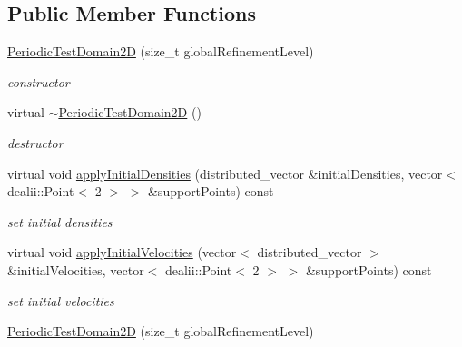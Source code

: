 \subsection*{Public Member Functions}
\begin{DoxyCompactItemize}
\item 
\hyperlink{classnatrium_1_1PeriodicTestDomain2D_a930da37a3e1be744aaf59e27ba956318}{Periodic\-Test\-Domain2\-D} (size\-\_\-t global\-Refinement\-Level)
\begin{DoxyCompactList}\small\item\em constructor \end{DoxyCompactList}\item 
\hypertarget{classnatrium_1_1PeriodicTestDomain2D_a81fe3504b294cd4d6219c360f465f84b}{virtual \hyperlink{classnatrium_1_1PeriodicTestDomain2D_a81fe3504b294cd4d6219c360f465f84b}{$\sim$\-Periodic\-Test\-Domain2\-D} ()}\label{classnatrium_1_1PeriodicTestDomain2D_a81fe3504b294cd4d6219c360f465f84b}

\begin{DoxyCompactList}\small\item\em destructor \end{DoxyCompactList}\item 
virtual void \hyperlink{classnatrium_1_1PeriodicTestDomain2D_abd87cfcf8cd6178c435bec6365923069}{apply\-Initial\-Densities} (distributed\-\_\-vector \&initial\-Densities, vector$<$ dealii\-::\-Point$<$ 2 $>$ $>$ \&support\-Points) const 
\begin{DoxyCompactList}\small\item\em set initial densities \end{DoxyCompactList}\item 
virtual void \hyperlink{classnatrium_1_1PeriodicTestDomain2D_aaf2befcb4b723013ed156b67439e718a}{apply\-Initial\-Velocities} (vector$<$ distributed\-\_\-vector $>$ \&initial\-Velocities, vector$<$ dealii\-::\-Point$<$ 2 $>$ $>$ \&support\-Points) const 
\begin{DoxyCompactList}\small\item\em set initial velocities \end{DoxyCompactList}\item 
\hypertarget{classnatrium_1_1PeriodicTestDomain2D_a930da37a3e1be744aaf59e27ba956318}{\hyperlink{classnatrium_1_1PeriodicTestDomain2D_a930da37a3e1be744aaf59e27ba956318}{Periodic\-Test\-Domain2\-D} (size\-\_\-t global\-Refinement\-Level)}\label{classnatrium_1_1PeriodicTestDomain2D_a930da37a3e1be744aaf59e27ba956318}


\end{DoxyCompactItemize}
